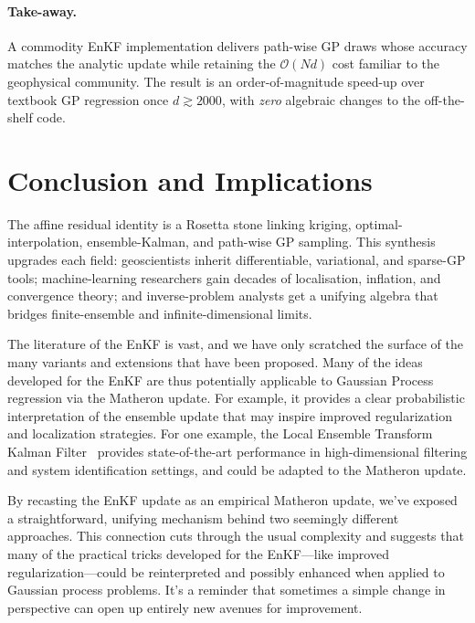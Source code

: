 \documentclass[runningheads]{llncs}
\begin{document}
\paragraph{Take-away.}
A commodity EnKF implementation delivers path-wise GP draws whose accuracy matches the
analytic update while retaining the $\mathcal O(Nd)$ cost familiar to
the geophysical community.
The result is an order-of-magnitude speed-up
over textbook GP regression once $d\!\gtrsim\!2000$, with \emph{zero}
algebraic changes to the off-the-shelf code.



\section{Conclusion and Implications}

The affine residual identity is a Rosetta stone linking kriging, optimal-interpolation, ensemble-Kalman, and path-wise GP sampling. This synthesis upgrades each field: geoscientists inherit differentiable, variational, and sparse-GP tools; machine-learning researchers gain decades of localisation, inflation, and convergence theory; and inverse-problem analysts get a unifying algebra that bridges finite-ensemble and infinite-dimensional limits.

The literature of the EnKF is vast, and we have only scratched the surface of the many variants and extensions that have been proposed.
Many of the ideas developed for the EnKF are thus potentially applicable to Gaussian Process regression via the Matheron update.
For example, it provides a clear probabilistic interpretation of the ensemble update that may inspire improved regularization and localization strategies.
For one example, the Local Ensemble Transform Kalman Filter~\cite{Bocquet2020Online} provides state-of-the-art performance in high-dimensional filtering and system identification settings, and could be adapted to the Matheron update.

By recasting the EnKF update as an empirical Matheron update, we've exposed a straightforward, unifying mechanism behind two seemingly different approaches. This connection cuts through the usual complexity and suggests that many of the practical tricks developed for the EnKF—like improved regularization—could be reinterpreted and possibly enhanced when applied to Gaussian process problems. It's a reminder that sometimes a simple change in perspective can open up entirely new avenues for improvement.
\end{document}
